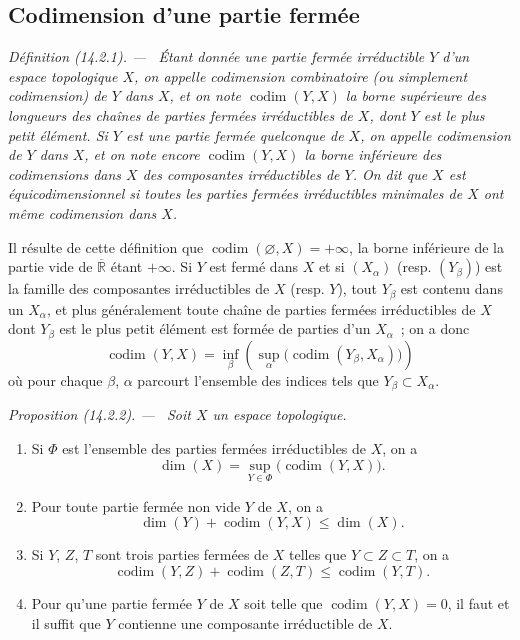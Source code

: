 \documentclass[10pt,oneside]{book}
\makeatletter
\newcommand{\setmanualcurrentlabel}[1]{\def\@currentlabel{#1}}
\newcommand{\oldpage}[2][]{%
  \setcounter{footnote}{0}%
  \marginpar{\scriptsize\textbf{#1}~|~#2}\ignorespaces}
\newenvironment{definition}[1][]{%
  \setmanualcurrentlabel{#1}\par\medskip\noindent\itshape Définition (#1). ---\ }{\par}
\newenvironment{proposition}[1][]{%
  \setmanualcurrentlabel{#1}\par\medskip\noindent\itshape Proposition (#1). ---\ }{\par}
\makeatother
\begin{document}
\subsection{Codimension d'une partie fermée}
\label{subsection:0.14.2-fr}

\begin{definition}[14.2.1]
\label{0.14.2.1-fr}
Étant donnée une partie fermée irréductible $Y$ d'un espace topologique $X$,
on appelle \emph{codimension combinatoire} (ou simplement \emph{codimension})
de $Y$ dans $X$, et on note $\operatorname{codim}(Y,X)$ la borne supérieure
des longueurs des chaînes de parties fermées irréductibles de $X$, dont $Y$
est le plus petit élément. Si $Y$ est une partie fermée quelconque de $X$, on
appelle \emph{codimension de $Y$ dans $X$}, et on note encore
$\operatorname{codim}(Y,X)$ la borne inférieure des codimensions dans $X$ des
composantes irréductibles de $Y$. On dit que $X$ est
\emph{équicodimensionnel} si toutes les parties fermées irréductibles minimales
de $X$ ont même codimension dans $X$.
\end{definition}

Il résulte de cette définition que
$\operatorname{codim}(\varnothing,X)=+\infty$, la borne inférieure de la
partie vide de $\overline{\mathbb R}$ étant $+\infty$. Si $Y$ est fermé dans
$X$ et si $(X_\alpha)$ (resp. $(Y_\beta)$) est la famille des composantes
irréductibles de $X$ (resp. $Y$), tout $Y_\beta$ est contenu dans un
$X_\alpha$, et plus généralement toute chaîne de parties fermées
irréductibles de $X$ dont $Y_\beta$ est le plus petit élément est formée de
parties d'un $X_\alpha$~; on a donc
\[
  \operatorname{codim}(Y,X)=
  \inf_\beta\left(\sup_\alpha
  \bigl(\operatorname{codim}(Y_\beta,X_\alpha)\bigr)\right)
  \tag{14.2.1.1}\label{0.14.2.1.1-fr}
\]
où pour chaque $\beta$, $\alpha$ parcourt l'ensemble des indices tels que
$Y_\beta\subset X_\alpha$.

\begin{proposition}[14.2.2]
\label{0.14.2.2-fr}
Soit $X$ un espace topologique.
\begin{enumerate}
  \item[\rm(i)] Si $\Phi$ est l'ensemble des parties fermées irréductibles de
  $X$, on a
  \[
    \dim(X)=\sup_{Y\in\Phi}\bigl(\operatorname{codim}(Y,X)\bigr).
    \tag{14.2.2.1}\label{0.14.2.2.1-fr}
  \]
  \oldpage[0\textsubscript{IV-1}]{9}
  \item[\rm(ii)] Pour toute partie fermée non vide $Y$ de $X$, on a
  \[
    \dim(Y)+\operatorname{codim}(Y,X)\leq\dim(X).
    \tag{14.2.2.2}\label{0.14.2.2.2-fr}
  \]
  \item[\rm(iii)] Si $Y$, $Z$, $T$ sont trois parties fermées de $X$ telles
  que $Y\subset Z\subset T$, on a
  \[
    \operatorname{codim}(Y,Z)+\operatorname{codim}(Z,T)
    \leq\operatorname{codim}(Y,T).
    \tag{14.2.2.3}\label{0.14.2.2.3-fr}
  \]
  \item[\rm(iv)] Pour qu'une partie fermée $Y$ de $X$ soit telle que
  $\operatorname{codim}(Y,X)=0$, il faut et il suffit que $Y$ contienne une
  composante irréductible de $X$.
\end{enumerate}
\end{proposition}
\end{document}
